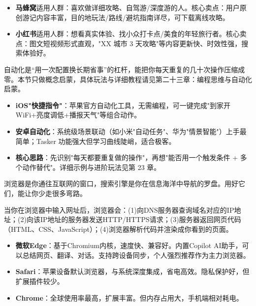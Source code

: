 
\begin{itemize}
  \item \textbf{马蜂窝}适用人群：喜欢做详细攻略、自驾游/深度游的人。核心卖点：用户原创游记内容丰富，目的地玩法/路线/避坑指南详尽，可下载离线攻略。
  \item \textbf{小红书}适用人群：想看真实体验、找小众打卡点/美食的年轻旅行者。核心卖点：图文短视频形式直观，"XX 城市 3 天攻略"等内容更新快、时效性强，搜索体验好。
\end{itemize}


自动化是“用一次配置换长期省事”的杠杆，能把你每天重复的几十次操作压缩成零。本节只做概念启蒙，具体玩法与详细教程请见第二十三章：编程思维与自动化启蒙。

\begin{itemize}
  \item \textbf{iOS"快捷指令"}：苹果官方自动化工具，无需编程，可一键完成"到家开 WiFi+亮度调低+播报天气"等组合动作。
  \item \textbf{安卓自动化}：系统级场景联动（如小米"自动任务"、华为"情景智能"）上手最简单；Tasker 功能强大但学习曲线陡峭，适合极客。
  \item \textbf{核心思路}：先识别"每天都要重复做的操作"，再想"能否用一个触发条件 + 多个动作替代"。详细示例与进阶玩法见第 23 章。
\end{itemize}


浏览器是你通往互联网的窗口，搜索引擎是你在信息海洋中导航的罗盘。用好它们，能让你少走很多弯路。


当你在浏览器中输入网址后，浏览器会：(1)向DNS服务器查询域名对应的IP地址；(2)向该IP地址的服务器发送HTTP/HTTPS请求；(3)服务器返回网页代码（HTML、CSS、JavaScript）；(4)浏览器解析代码并渲染成你看到的页面。


\begin{itemize}
  \item \textbf{微软Edge}：基于Chromium内核，速度快、兼容好。内置Copilot AI助手，可以总结网页、翻译、对话。支持跨设备同步，个人强烈推荐作为主力浏览器。
  \item \textbf{Safari}：苹果设备默认浏览器，与系统深度集成，省电高效。隐私保护好，但扩展插件较少。
  \item \textbf{Chrome}：全球使用率最高，扩展丰富。但内存占用大，手机端相对耗电。
\end{itemize}

